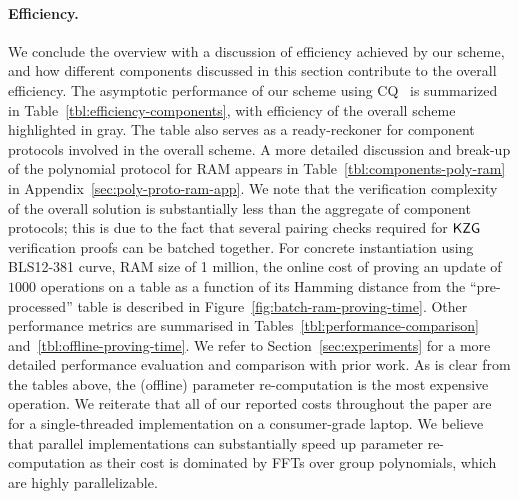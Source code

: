 \paragraph{\bf Efficiency.} We conclude the overview with a discussion of efficiency achieved by our scheme, and
how different components discussed in this section contribute to the overall efficiency. The asymptotic performance
of our scheme using CQ~\cite{EPRINT:EagFioGab22} is summarized in Table~\ref{tbl:efficiency-components}, with
efficiency of the overall scheme highlighted in gray. The table also serves as a ready-reckoner for component protocols
involved in the overall scheme. A more detailed discussion and break-up of the polynomial protocol for RAM
appears in Table~\ref{tbl:components-poly-ram} in Appendix~\ref{sec:poly-proto-ram-app}. We note that the verification complexity of the overall solution is substantially
less than the aggregate of component protocols; this is due to the fact that several pairing checks required for
$\mathsf{KZG}$ verification proofs can be batched together. For concrete instantiation using BLS12-381 curve, RAM size
of 1 million, the online cost of proving an update of $1000$ operations on a table as a function of its
Hamming distance from the ``pre-processed'' table is described in Figure~\ref{fig:batch-ram-proving-time}.
Other performance metrics are summarised in Tables~\ref{tbl:performance-comparison} and~\ref{tbl:offline-proving-time}.
We refer to Section~\ref{sec:experiments} for a more detailed performance evaluation and comparison with prior work.
As is clear from the tables above, the (offline) parameter re-computation is the most expensive operation.
We reiterate that all of our reported costs throughout the paper are for a single-threaded implementation on a consumer-grade laptop.
We believe that parallel implementations can
substantially speed up parameter re-computation as their cost is dominated by FFTs over group polynomials, which
are highly parallelizable.

